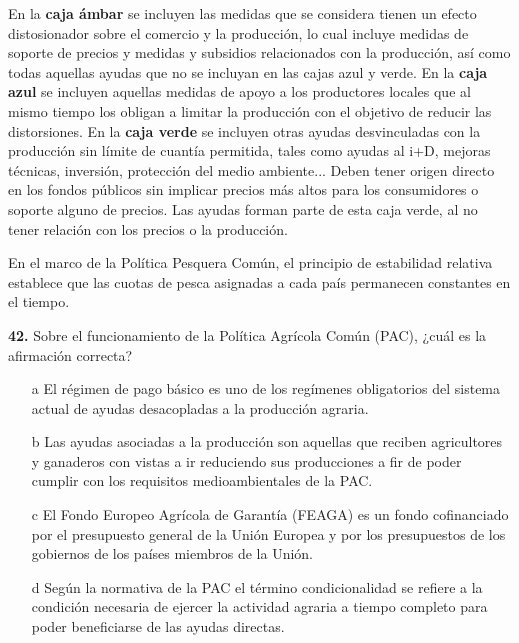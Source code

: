 \documentclass{nuevotema}
\begin{document}
En la \textbf{caja ámbar} se incluyen las medidas que se considera tienen un efecto distosionador sobre el comercio y la producción, lo cual incluye medidas de soporte de precios y medidas y subsidios relacionados con la producción, así como todas aquellas ayudas que no se incluyan en las cajas azul y verde. En la \textbf{caja azul} se incluyen aquellas medidas de apoyo a los productores locales que al mismo tiempo los obligan a limitar la producción con el objetivo de reducir las distorsiones. En la \textbf{caja verde} se incluyen otras ayudas desvinculadas con la producción sin límite de cuantía permitida, tales como ayudas al i+D, mejoras técnicas, inversión, protección del medio ambiente... Deben tener origen directo en los fondos públicos sin implicar precios más altos para los consumidores o soporte alguno de precios. Las ayudas  forman parte de esta caja verde, al no tener relación con los precios o la producción.


En el marco de la Política Pesquera Común, el principio de estabilidad relativa establece que las cuotas de pesca asignadas a cada país permanecen constantes en el tiempo. 

\preguntas


\textbf{42.} Sobre el funcionamiento de la Política Agrícola Común (PAC), ¿cuál es la afirmación correcta?

\begin{itemize}
	\item[a] El régimen de pago básico es uno de los regímenes obligatorios del sistema actual de ayudas desacopladas a la producción agraria.
	\item[b] Las ayudas asociadas a la producción son aquellas que reciben agricultores y ganaderos con vistas a ir reduciendo sus producciones a fir de poder cumplir con los requisitos medioambientales de la PAC.
	\item[c] El Fondo Europeo Agrícola de Garantía (FEAGA) es un fondo cofinanciado por el presupuesto general de la Unión Europea y por los presupuestos de los gobiernos de los países miembros de la Unión.
	\item[d] Según la normativa de la PAC el término condicionalidad se refiere a la condición necesaria de ejercer la actividad agraria a tiempo completo para poder beneficiarse de las ayudas directas.
\end{itemize}
\end{document}

